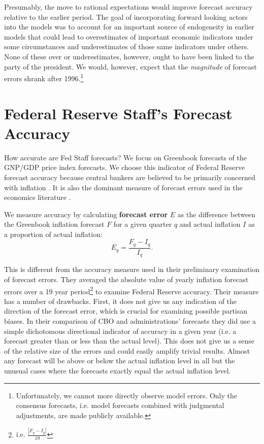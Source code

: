 \documentclass[a4paper]{article}
\begin{document}
Presumably, the move to rational expectations would improve forecast accuracy relative to the earlier period. The goal of incorporating forward looking actors into the models was to account for an important source of endogeneity in earlier models that could lead to overestimates of important economic indicators under some circumstances and underestimates of those same indicators under others. None of these over or underestimates, however, ought to have been linked to the party of the president. We would, however, expect that the \emph{magnitude} of forecast errors shrank after 1996.\footnote{Unfortunately, we cannot more directly observe model errors. Only the consensus forecasts, i.e. model forecasts combined with judgmental adjustments, are made publicly available.}
 


\section{Federal Reserve Staff's Forecast Accuracy}\label{ForecastAcc}

How accurate are Fed Staff forecasts? We focus on Greenbook forecasts of the GNP/GDP price index forecasts. We choose this indicator of Federal Reserve forecast accuracy because central bankers are believed to be primarily concerned with inflation \citep[e.g.][]{Cukierman1992,Mukherjee2008,Tillmann2008}. It is also the dominant measure of forecast errors used in the economics literature \citep[c.f.][]{Romer2000}. 

We measure accuracy by calculating {\bf{forecast error}} $E$ as the difference between the Greenbook inflation forecast $F$ for a given quarter $q$ and actual inflation $I$ as a proportion of actual inflation:
%
\begin{equation}
    E_{q} = \frac{F_{q} - I_{q}}{I_{q}}.
\end{equation}

This is different from the accuracy measure \cite{Frendreis2000} used in their preliminary examination of forecast errors. They averaged the absolute value of yearly inflation forecast errors over a 19 year period\footnote{i.e. $\frac{|F_{y} - I_{y}|}{19}$} to examine Federal Reserve accuracy. Their measure has a number of drawbacks. First, it does not give us any indication of the direction of the forecast error, which is crucial for examining possible partisan biases. In their comparison of CBO and administrations' forecasts they did use a simple dichotomous directional indicator of accuracy in a given year (i.e. a forecast greater than or less than the actual level). This does not give us a sense of the relative size of the errors and could easily amplify trivial results. Almost any forecast will be above or below the actual inflation level in all but the unusual cases where the forecasts exactly equal the actual inflation level. 
\end{document}
